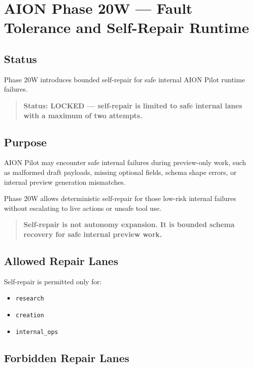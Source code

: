 \section{AION Phase 20W --- Fault Tolerance and Self-Repair Runtime}
\label{sec:aion-phase20w-self-repair-runtime}

\subsection{Status}

Phase 20W introduces bounded self-repair for safe internal AION Pilot runtime failures.

\begin{quote}
\textbf{Status: LOCKED --- self-repair is limited to safe internal lanes with a maximum of two attempts.}
\end{quote}

\subsection{Purpose}

AION Pilot may encounter safe internal failures during preview-only work, such as malformed draft payloads, missing optional fields, schema shape errors, or internal preview generation mismatches.

Phase 20W allows deterministic self-repair for those low-risk internal failures without escalating to live actions or unsafe tool use.

\begin{quote}
\textbf{Self-repair is not autonomy expansion. It is bounded schema recovery for safe internal preview work.}
\end{quote}

\subsection{Allowed Repair Lanes}

Self-repair is permitted only for:

\begin{itemize}
  \item \texttt{research}
  \item \texttt{creation}
  \item \texttt{internal\_ops}
\end{itemize}

\subsection{Forbidden Repair Lanes}

